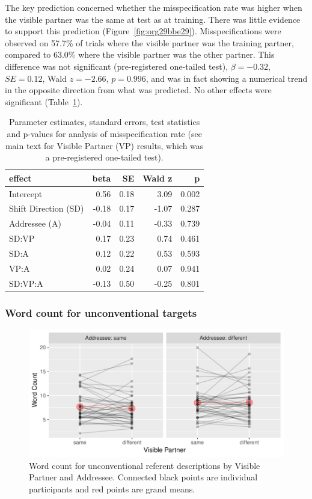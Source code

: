 \documentclass[natbib,man,a4paper]{apa6}
\begin{document}
The key prediction concerned whether the misspecification rate was higher when the visible partner was the same at test as at training. There was little evidence to support this prediction (Figure~\ref{fig:org29bbe29}). Misspecifications were observed on 
57.7\%
of trials where the visible partner was the training partner, compared to 
63.0\%
where the visible partner was the other partner.
This difference was not significant (pre-registered one-tailed test), 
\(\beta = -0.32\), \(SE = 0.12\), Wald \(z = -2.66\), \(p = 0.996\), and was in fact showing a numerical trend in the opposite direction from what was predicted. No other effects were significant (Table~\ref{tbl:exp3-lmem}).

\begin{table}[ht]
\centering
\caption{Parameter estimates, standard errors, test statistics and p-values for analysis of misspecification rate (see main text for Visible Partner (VP) results, which was a pre-registered one-tailed test).} 
\label{tbl:exp3-lmem}
\begin{tabular}{lrrrr}
  \hline
effect & beta & SE & Wald z & p \\ 
  \hline
Intercept & 0.56 & 0.18 & 3.09 & 0.002 \\ 
  Shift Direction (SD) & -0.18 & 0.17 & -1.07 & 0.287 \\ 
  Addressee (A) & -0.04 & 0.11 & -0.33 & 0.739 \\ 
  SD:VP & 0.17 & 0.23 & 0.74 & 0.461 \\ 
  SD:A & 0.12 & 0.22 & 0.53 & 0.593 \\ 
  VP:A & 0.02 & 0.24 & 0.07 & 0.941 \\ 
  SD:VP:A & -0.13 & 0.50 & -0.25 & 0.801 \\ 
   \hline
\end{tabular}
\end{table}

\subsubsection*{Word count for unconventional targets}
\label{sec:org6c7dd1c}

\begin{figure}[htbp]
\centering
\includegraphics[width=.9\linewidth]{exp3/img/exp3-wc-plot.pdf}
\caption{\label{fig:orgaad91ed}
Word count for unconventional referent descriptions by Visible Partner and Addressee. Connected black points are individual participants and red points are grand means.}
\end{figure}
\end{document}
